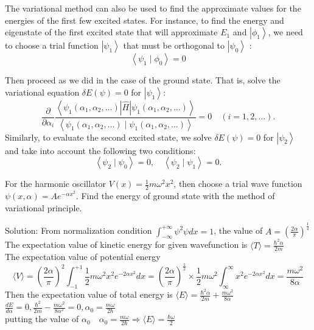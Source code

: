  The variational method can also be used to find the approximate values for the energies of the first few excited states. For instance, to find the energy and eigenstate of the first excited state that will approximate $E_{1}$ and $\left|\phi_{1}\right\rangle$, we need to choose a trial function $\left|\psi_{1}\right\rangle$ that must be orthogonal to $\left|\psi_{0}\right\rangle$ :
$$\left\langle\psi_{1} \mid \phi_{0}\right\rangle=0$$

Then proceed as we did in the case of the ground state. That is, solve the variational equation $\delta E(\psi)=0$ for $\left|\psi_{1}\right\rangle:$
$$
\frac{\partial}{\partial \alpha_{i}} \frac{\left\langle\psi_{1}\left(\alpha_{1}, \alpha_{2}, \ldots\right)|\hat{H}| \psi_{1}\left(\alpha_{1}, \alpha_{2}, \ldots\right)\right\rangle}{\left\langle\psi_{1}\left(\alpha_{1}, \alpha_{2}, \ldots\right) \mid \psi_{1}\left(\alpha_{1}, \alpha_{2}, \ldots\right)\right\rangle}=0 \quad(i=1,2, \ldots) .
$$
Similarly, to evaluate the second excited state, we solve $\delta E(\psi)=0$ for  $\left|\psi_{2}\right\rangle$ and take into account the following two conditions:
$$
\left\langle\psi_{2} \mid \psi_{0}\right\rangle=0, \quad\left\langle\psi_{2} \mid \psi_{1}\right\rangle=0 .
$$
\begin{exercise}
 For the harmonic oscillator $V(x)=\frac{1}{2} m \omega^{2} x^{2}$, then choose a trial wave function $\psi(x, \alpha)=A e^{-\alpha x^{2}}$. Find the energy of ground state with the method of variational principle.
\end{exercise}
\begin{answer}
	Solution: From normalization condition $\int_{-\infty}^{+\infty} \psi^{2} \psi d x=1$, the value of $A=\left(\frac{2 \alpha}{\pi}\right)^{\frac{1}{4}}$\\
	 The expectation value of kinetic energy for given wavefunction is $\langle T\rangle=\frac{\hbar^{2} \alpha}{2 m}$\\
	The expectation value of potential energy
	$$
	\langle V\rangle=\left(\frac{2 \alpha}{\pi}\right)^{2} \int_{-1}^{+1} \frac{1}{2} m \omega^{2} x^{2} e^{-2 \alpha x^{2}} d x=\left(\frac{2 \alpha}{\pi}\right)^{\frac{1}{2}} \times \frac{1}{2} m \omega^{2} \int_{\infty}^{\infty} x^{2} e^{-2 \alpha x^{2}} d x=\frac{m \omega^{2}}{8 \alpha}
	$$
	Then the expectation value of total energy is $\langle E\rangle=\frac{\hbar^{2} \alpha}{2 m}+\frac{m \omega^{2}}{8 \alpha}$\\
	 $\frac{d E}{d \alpha}=0, \frac{\hbar^{2}}{2 m}-\frac{m \omega^{2}}{8 \alpha^{2}}=0, \alpha_{0}=\frac{m \omega}{2 \hbar}$\\
	  putting the value of $\alpha_{0} \quad \alpha_{0}=\frac{m \omega}{2 \hbar} \Rightarrow\langle E\rangle=\frac{\hbar \omega}{2}$
\end{answer}
